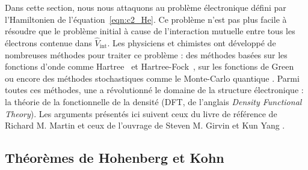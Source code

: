 Dans cette section, nous nous attaquons au problème électronique défini par l'Hamiltonien de l'équation~\eqref{eqn:c2_He}. Ce problème n'est pas plus facile à résoudre que le problème initial à cause de l'interaction mutuelle entre tous les électrons contenue dans $\hat{V}_\text{int}$. Les physiciens et chimistes ont développé de nombreuses méthodes pour traiter ce problème : des méthodes basées sur les fonctions d'onde comme Hartree~\cite{hartreeWaveMechanicsAtom1928,hartreeWaveMechanicsAtom1928a} et Hartree-Fock~\cite{fockNaeherungsmethodeZurLoesung1930,slaterNoteHartreesMethod1930,diracQuantumMechanicsManyelectron1929}, sur les fonctions de Green~\cite{martinTheoryManyParticleSystems1959,AbrikosovAAGorkov} ou encore des méthodes stochastiques comme le Monte-Carlo quantique \cite{ceperleyGroundStateElectron1980}. Parmi toutes ces méthodes, une a révolutionné le domaine de la structure électronique : la théorie de la fonctionnelle de la densité (DFT, de l'anglais \textit{Density Functional Theory}). Les arguments présentés ici suivent ceux du livre de référence de Richard M. Martin \cite{martinElectronicStructureBasic2004} et ceux de l'ouvrage de Steven M. Girvin et Kun Yang \cite{girvinModernCondensedMatter2019}. 

\subsection{Théorèmes de Hohenberg et Kohn}\label{sec:HK}

